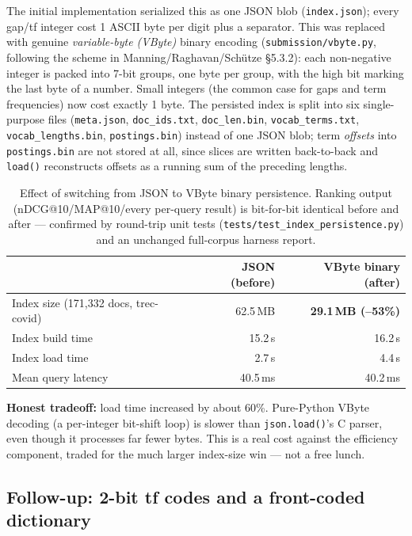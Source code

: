 \documentclass[11pt]{article}
\begin{document}
The initial implementation serialized this as one JSON blob
(\texttt{index.json}); every gap/tf integer cost 1 ASCII byte per digit
plus a separator. This was replaced with genuine \emph{variable-byte
(VByte)} binary encoding (\texttt{submission/vbyte.py}, following the
scheme in Manning/Raghavan/Sch\"utze \S 5.3.2): each non-negative integer
is packed into 7-bit groups, one byte per group, with the high bit
marking the last byte of a number. Small integers (the common case for
gaps and term frequencies) now cost exactly 1 byte. The persisted index
is split into six single-purpose files (\texttt{meta.json},
\texttt{doc\_ids.txt}, \texttt{doc\_len.bin}, \texttt{vocab\_terms.txt},
\texttt{vocab\_lengths.bin}, \texttt{postings.bin}) instead of one JSON
blob; term \emph{offsets} into \texttt{postings.bin} are not stored at
all, since slices are written back-to-back and \texttt{load()}
reconstructs offsets as a running sum of the preceding lengths.

\begin{table}[h]
\centering
\begin{tabular}{lrr}
\toprule
 & JSON (before) & VByte binary (after) \\
\midrule
Index size (171{,}332 docs, trec-covid) & 62.5\,MB & \textbf{29.1\,MB (--53\%)} \\
Index build time & 15.2\,s & 16.2\,s \\
Index load time & 2.7\,s & 4.4\,s \\
Mean query latency & 40.5\,ms & 40.2\,ms \\
\bottomrule
\end{tabular}
\caption{Effect of switching from JSON to VByte binary persistence. Ranking
output (nDCG@10/MAP@10/every per-query result) is bit-for-bit identical
before and after --- confirmed by round-trip unit tests
(\texttt{tests/test\_index\_persistence.py}) and an unchanged full-corpus
harness report.}
\end{table}

\noindent\textbf{Honest tradeoff:} load time increased by about 60\%.
Pure-Python VByte decoding (a per-integer bit-shift loop) is slower than
\texttt{json.load()}'s C parser, even though it processes far fewer
bytes. This is a real cost against the efficiency component, traded for
the much larger index-size win --- not a free lunch.

\subsection{Follow-up: 2-bit tf codes and a front-coded dictionary}
\label{sec:tfcodes}
\end{document}
